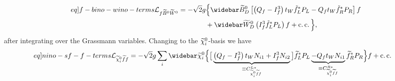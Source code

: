 \documentclass[english, notitlepage]{article}
\begin{document}
            \begin{align}
                \label[eq]{f-bino-wino-terms}
                \nonumber
                \L_{f\bino\wino} = -\sqrt{2} g & \Big\{ \wbar{\wtilde{B}}^0_D \bclosed{ \pclosed{Q_f - I^3_f}t_W \tilde{f}_L^* P_L - Q_f t_W \tilde{f}_R^* P_R } f \\
                                               & + \wbar{\wtilde{W}}^0_D \pclosed{I^3_f \tilde{f}_L^* P_L} f + \cc \Big\},
            \end{align}
            after integrating over the Grassmann variables.
            Changing to the $\nino[i]$-basis we have
            \begin{align}
                \label[eq]{nino-sf-f-terms}
                \L_{\nino[i]\wtilde{f}f} = -\sqrt{2} g   \sum_{i} \wbar{\wtilde{\chi}}^0_i & \Big\{ \big[ \underbrace{\pclosed{Q_f - I^3_f}t_W N_{i1}  + I^3_f N_{i2}}_{\equiv C_{\nino[i] \wtilde{f} f}^{L*}} \big] \wtilde{f}_L^* P_L \underbrace{- Q_f t_W N_{i1}}_{\equiv C_{\nino[i] \wtilde{f} f}^{R*}} \wtilde{f}_R^* P_R \Big\} f + \cc
            \end{align}
\end{document}
